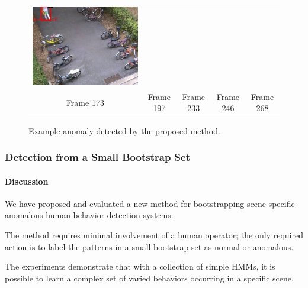 \begin{frame}
\begin{figure}[t]
\begin{tabular}{ccccc}
            \includegraphics[scale=0.17]{figures/case-3-suspicious-0268} \\
            \small Frame 173 & 
            \small Frame 197 & 
            \small Frame 233 & 
            \small Frame 246 & 
            \small Frame 268
        \end{tabular}
        \caption{Example anomaly detected by the proposed method.}
        \label{fig:suspicious-behavior-detected}
    \end{figure}

\end{frame}


\begin{frame}
    \frametitle{Detection from a Small Bootstrap Set}
    \framesubtitle{Discussion}

    We have proposed and evaluated a new method for bootstrapping 
    scene-specific anomalous human behavior detection systems. 
    
    \bigskip
    
    The method requires minimal involvement of a human operator; the 
    only required action is to label the patterns in a small bootstrap 
    set as normal or anomalous. 

    \bigskip

    The experiments demonstrate that with a collection of simple HMMs, 
    it is possible to learn a complex set of varied behaviors occurring in 
    a specific scene. 

\end{frame}

